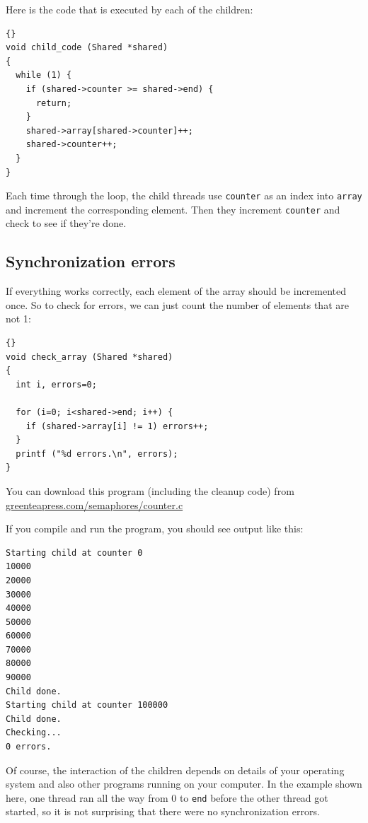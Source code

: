 \documentclass{book}
\begin{document}
Here is the code that is executed by each of the children:

\begin{latin}
\begin{lstlisting}[title={}]{}
void child_code (Shared *shared)
{
  while (1) {
    if (shared->counter >= shared->end) {
      return;
    }
    shared->array[shared->counter]++;
    shared->counter++;
  }
}
\end{lstlisting}
\end{latin}

Each time through the loop, the child threads use {\tt counter}
as an index into {\tt array} and increment the corresponding element.
Then they increment {\tt counter} and check to see if they're done.

\subsection{Synchronization errors}

If everything works correctly, each element of the array should be
incremented once.  So to check for errors, we can just count the
number of elements that are not 1:

\begin{latin}
\begin{lstlisting}[title={}]{}
void check_array (Shared *shared)
{
  int i, errors=0;

  for (i=0; i<shared->end; i++) {
    if (shared->array[i] != 1) errors++;
  }
  printf ("%d errors.\n", errors);
}
\end{lstlisting}
\end{latin}

You can download this program (including the cleanup code) from
\url{greenteapress.com/semaphores/counter.c}

If you compile and run the program, you should see output like this:

\begin{verbatim}
Starting child at counter 0
10000
20000
30000
40000
50000
60000
70000
80000
90000
Child done.
Starting child at counter 100000
Child done.
Checking...
0 errors.
\end{verbatim}

Of course, the interaction of the children depends on details
of your operating system and also other programs running on your
computer.  In the example shown here, one thread ran all the way
from 0 to {\tt end} before the other thread got started, so it is
not surprising that there were no synchronization errors.
\end{document}
